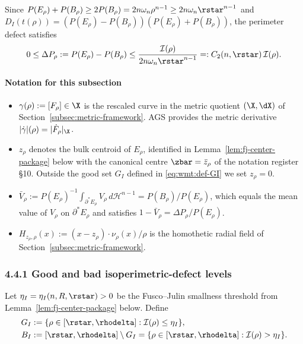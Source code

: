 Since $P(E_\rho)+P(B_\rho)\ge 2P(B_\rho)=2n\omega_n\rho^{n-1}\ge
2n\omega_n\rstar^{n-1}$ and $D_I(t(\rho))
=(P(E_\rho)-P(B_\rho))(P(E_\rho)+P(B_\rho))$, the perimeter defect
satisfies
\begin{equation}\label{eq:wmt:DP-DI}
   0\le\Delta P_\rho
        :=P(E_\rho)-P(B_\rho)
   \le \frac{\mathcal I(\rho)}{2n\omega_n\rstar^{n-1}}
   =: C_2(n,\rstar)\,\mathcal I(\rho).
\end{equation}

\paragraph{Notation for this subsection}

\begin{itemize}
\item $\gamma(\rho):=[F_\rho]\in\X$ is the rescaled curve in the metric
      quotient $(\X,\dX)$ of Section~\ref{subsec:metric-framework}.
      AGS \cite[Thm.~1.1.2]{AGS2008} provides the metric derivative
      $|\dot\gamma|(\rho)=|\dot F_\rho|_{\X}$.
\item $z_\rho$ denotes the bulk centroid of $E_\rho$, identified in
      Lemma~\ref{lem:fj-center-package} below with the canonical centre
      $\zbar=\bar z_\rho$ of the notation register \S10. Outside the
      good set $G_I$ defined in \eqref{eq:wmt:def-GI} we set
      $z_\rho=0$.
\item $\bar V_\rho:=P(E_\rho)^{-1}\int_{\partial^*E_\rho}V_\rho\,
      d\mathcal H^{n-1}=P(B_\rho)/P(E_\rho)$, which equals
      the mean value of $V_\rho$ on $\partial^*E_\rho$ and satisfies
      $1-\bar V_\rho=\Delta P_\rho/P(E_\rho)$.
\item $H_{z_\rho,\rho}(x):=(x-z_\rho)\cdot\nu_\rho(x)/\rho$ is the
      homothetic radial field of Section~\ref{subsec:metric-framework}.
\end{itemize}

\subsubsection{4.4.1 Good and bad isoperimetric-defect levels}
\label{subsec:wmt:good-bad}

\begin{definition}
\label{def:wmt:GI-BI}
Let $\eta_I=\eta_I(n,R,\rstar)>0$ be the Fusco--Julin smallness
threshold from Lemma~\ref{lem:fj-center-package} below. Define
\begin{align}
   G_I &:= \{\rho\in[\rstar,\rhodelta]:\mathcal I(\rho)\le\eta_I\},
       \label{eq:wmt:def-GI}\\
   B_I &:= [\rstar,\rhodelta]\setminus G_I
       =\{\rho\in[\rstar,\rhodelta]:\mathcal I(\rho)>\eta_I\}.
       \label{eq:wmt:def-BI}
\end{align}
\end{definition}

